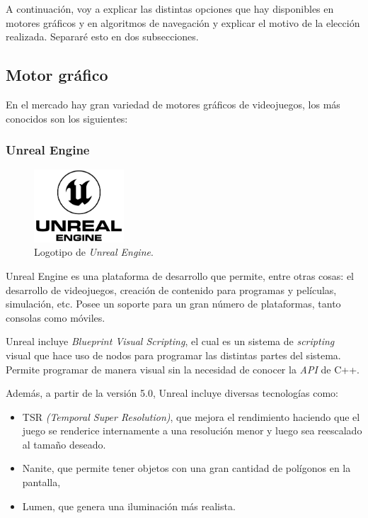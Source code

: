 \bigskip

A continuación, voy a explicar las distintas opciones que hay disponibles en motores gráficos y en algoritmos de navegación y explicar el motivo de la elección realizada. Separaré esto en dos subsecciones.

\subsection{Motor gráfico}
En el mercado hay gran variedad de motores gráficos de videojuegos, los más conocidos son los siguientes:

\subsubsection{Unreal Engine}

\begin{figure}[H]
   \centering
   \includegraphics[width=0.3\textwidth]{imagenes/UE_LOGO.png}
   \caption{Logotipo de \textit{Unreal Engine}\cite{unreal-logo}.}
\end{figure}

Unreal Engine \cite{unreal} es una plataforma de desarrollo que permite, entre otras cosas: el desarrollo de videojuegos, creación de contenido para programas y películas, simulación, etc. Posee un soporte para un gran número de plataformas, tanto consolas como móviles.

\bigskip

Unreal incluye \textit{Blueprint Visual Scripting}, el cual es un sistema de \textit{scripting} visual que hace uso de nodos para programar las distintas partes del sistema. Permite programar de manera visual sin la necesidad de conocer la \textit{API} de C++.

\bigskip

Además, a partir de la versión 5.0, Unreal incluye diversas tecnologías como: 

\begin{itemize}
   \item TSR \textit{(Temporal Super Resolution)}, que mejora el rendimiento haciendo que el juego se renderice internamente a una resolución menor y luego sea reescalado al tamaño deseado.
   \item Nanite, que permite tener objetos con una gran cantidad de polígonos en la pantalla, 
   \item Lumen, que genera una iluminación más realista.
\end{itemize}

